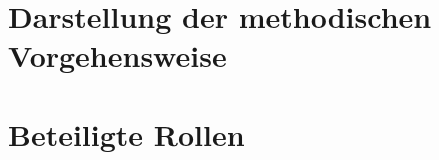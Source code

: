 \section{Darstellung der methodischen Vorgehensweise}\label{sec:methode}




\section{Beteiligte Rollen}\label{sec:rollen}

